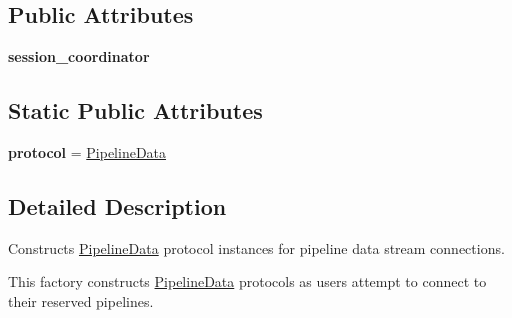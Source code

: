 \subsection*{Public Attributes}
\begin{DoxyCompactItemize}
\item 
\hypertarget{classhwm_1_1network_1_1protocols_1_1data_1_1_pipeline_data_factory_a74590f3acbd666d76fb2c73e1a62d539}{{\bfseries session\-\_\-coordinator}}\label{classhwm_1_1network_1_1protocols_1_1data_1_1_pipeline_data_factory_a74590f3acbd666d76fb2c73e1a62d539}

\end{DoxyCompactItemize}
\subsection*{Static Public Attributes}
\begin{DoxyCompactItemize}
\item 
\hypertarget{classhwm_1_1network_1_1protocols_1_1data_1_1_pipeline_data_factory_ae394c05d5259ab6afc90aa50acc504a2}{{\bfseries protocol} = \hyperlink{classhwm_1_1network_1_1protocols_1_1data_1_1_pipeline_data}{Pipeline\-Data}}\label{classhwm_1_1network_1_1protocols_1_1data_1_1_pipeline_data_factory_ae394c05d5259ab6afc90aa50acc504a2}

\end{DoxyCompactItemize}


\subsection{Detailed Description}
Constructs \hyperlink{classhwm_1_1network_1_1protocols_1_1data_1_1_pipeline_data}{Pipeline\-Data} protocol instances for pipeline data stream connections. 

This factory constructs \hyperlink{classhwm_1_1network_1_1protocols_1_1data_1_1_pipeline_data}{Pipeline\-Data} protocols as users attempt to connect to their reserved pipelines. 

